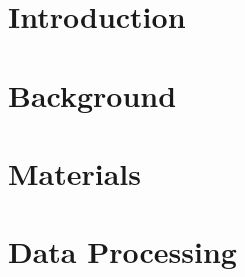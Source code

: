 

\raggedbottom %



\frontmatter	 %


\newpage
\clearpage

\newpage

\tableofcontents*												%

\mainmatter
%


\chapter{Introduction}


\chapter{Background} 




\chapter{Materials}





\chapter{Data Processing}


